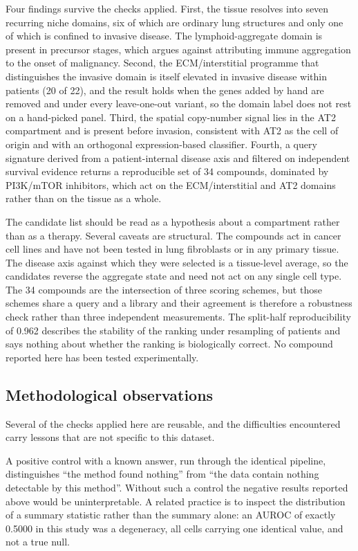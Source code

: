 Four findings survive the checks applied. First, the tissue resolves into seven recurring
niche domains, six of which are ordinary lung structures and only one of which is confined
to invasive disease. The lymphoid-aggregate domain is present in precursor stages, which
argues against attributing immune aggregation to the onset of malignancy. Second, the
ECM/interstitial programme that distinguishes the invasive domain is itself elevated in
invasive disease within patients (20 of 22), and the result holds when the genes added by
hand are removed and under every leave-one-out variant, so the domain label does not rest on
a hand-picked panel. Third, the spatial copy-number signal lies in the AT2 compartment and
is present before invasion, consistent with AT2 as the cell of origin and with an orthogonal
expression-based classifier. Fourth, a query signature derived from a patient-internal
disease axis and filtered on independent survival evidence returns a reproducible set of 34
compounds, dominated by PI3K/mTOR inhibitors, which act on the ECM/interstitial and AT2
domains rather than on the tissue as a whole.

The candidate list should be read as a hypothesis about a compartment rather than as a
therapy. Several caveats are structural. The compounds act in cancer cell lines and have not
been tested in lung fibroblasts or in any primary tissue. The disease axis against which they
were selected is a tissue-level average, so the candidates reverse the aggregate state and
need not act on any single cell type. The 34 compounds are the intersection of three scoring
schemes, but those schemes share a query and a library and their agreement is therefore a
robustness check rather than three independent measurements. The split-half reproducibility
of 0.962 describes the stability of the ranking under resampling of patients and says
nothing about whether the ranking is biologically correct. No compound reported here has
been tested experimentally.

\subsection{Methodological observations}

Several of the checks applied here are reusable, and the difficulties encountered carry
lessons that are not specific to this dataset.

A positive control with a known answer, run through the identical pipeline, distinguishes
``the method found nothing'' from ``the data contain nothing detectable by this method''.
Without such a control the negative results reported above would be uninterpretable. A
related practice is to inspect the distribution of a summary statistic rather than the
summary alone: an AUROC of exactly 0.5000 in this study was a degeneracy, all cells carrying
one identical value, and not a true null.


